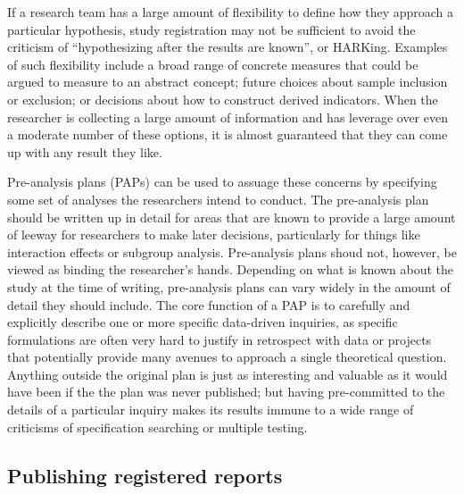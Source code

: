 If a research team has a large amount of flexibility
to define how they approach a particular hypothesis,
study registration may not be sufficient to avoid the criticism of
``hypothesizing after the results are known'', or HARKing.
Examples of such flexibility include a broad range
of concrete measures that could be argued to measure to an abstract concept;
future choices about sample inclusion or exclusion;
or decisions about how to construct derived indicators.
When the researcher is collecting a large amount of information
and has leverage over even a moderate number of these options,
it is almost guaranteed that they can come up with any result they like.

Pre-analysis plans (PAPs) can be used to assuage these concerns
by specifying some set of analyses the researchers intend to conduct.
The pre-analysis plan should be written up in detail
for areas that are known to provide a large amount of leeway
for researchers to make later decisions,
particularly for things like interaction effects or subgroup analysis.
Pre-analysis plans shoud not, however, be viewed as binding the researcher's hands.
Depending on what is known about the study at the time of writing,
pre-analysis plans can vary widely in the amount of detail they should include.
The core function of a PAP is to carefully and explicitly describe
one or more specific data-driven inquiries,
as specific formulations are often very hard to justify in retrospect
with data or projects that potentially provide many avenues to approach
a single theoretical question.
Anything outside the original plan is just as interesting and valuable
as it would have been if the the plan was never published;
but having pre-committed to the details of a particular inquiry makes its results
immune to a wide range of criticisms of specification searching or multiple testing.


\subsection{Publishing registered reports}

